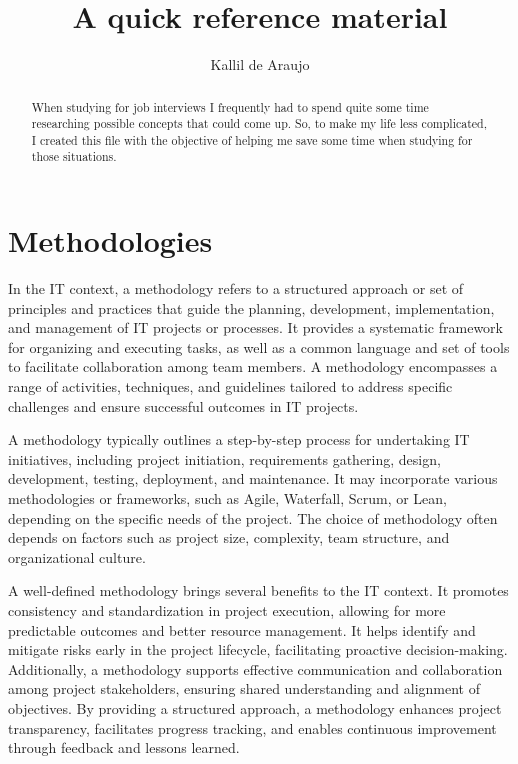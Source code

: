 \documentclass[]{report}
\title{A quick reference material}
\author{Kallil de Araujo}
\begin{document}
\maketitle
\tableofcontents

\begin{abstract}
	
	When studying for job interviews I frequently had to spend quite some time researching possible concepts that could come up. So, to make my life less complicated, I created this file with the objective of helping me save some time when studying for those situations.
	
\end{abstract}

\chapter{Methodologies}

In the IT context, a methodology refers to a structured approach or set of principles and practices that guide the planning, development, implementation, and management of IT projects or processes. It provides a systematic framework for organizing and executing tasks, as well as a common language and set of tools to facilitate collaboration among team members. A methodology encompasses a range of activities, techniques, and guidelines tailored to address specific challenges and ensure successful outcomes in IT projects.

A methodology typically outlines a step-by-step process for undertaking IT initiatives, including project initiation, requirements gathering, design, development, testing, deployment, and maintenance. It may incorporate various methodologies or frameworks, such as Agile, Waterfall, Scrum, or Lean, depending on the specific needs of the project. The choice of methodology often depends on factors such as project size, complexity, team structure, and organizational culture.

A well-defined methodology brings several benefits to the IT context. It promotes consistency and standardization in project execution, allowing for more predictable outcomes and better resource management. It helps identify and mitigate risks early in the project lifecycle, facilitating proactive decision-making. Additionally, a methodology supports effective communication and collaboration among project stakeholders, ensuring shared understanding and alignment of objectives. By providing a structured approach, a methodology enhances project transparency, facilitates progress tracking, and enables continuous improvement through feedback and lessons learned.
\end{document}
